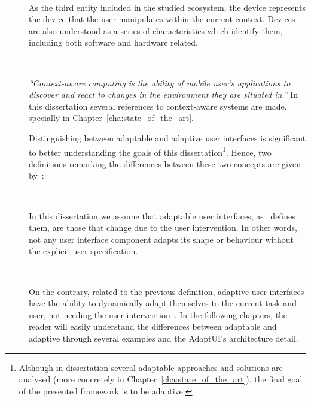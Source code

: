 \begin{description}
  \item[] \hfill \\
  \begin{mdframed}[hidealllines=true,backgroundcolor=gray!20]
  As the third entity included in the studied ecosystem, the device represents 
  the device that the user manipulates within the current context. Devices are
  also understood as a series of characteristics which identify them, including
  both software and hardware related.
  \end{mdframed}
  
  \item[] \hfill \\
  \begin{mdframed}[hidealllines=true,backgroundcolor=gray!20]
  \textit{``Context-aware computing is the ability of mobile user's applications 
  to discover and react to changes in the environment they are situated in.''} 
  In this dissertation several references to context-aware systems are made, 
  specially in Chapter~\ref{cha:state_of_the_art}.
  \end{mdframed}
  
  Distinguishing between adaptable and adaptive user interfaces is significant
  to better understanding the goals of this dissertation\footnote{Although in
  dissertation several adaptable approaches and solutions are analysed (more
  concretely in Chapter~\ref{cha:state_of_the_art}), the final goal of the 
  presented framework is to be adaptive.}. Hence, two definitions remarking the 
  differences between these two concepts are given by~\citeauthor{fischer_user_2001}:
  
  \item[] \hfill \\
  \begin{mdframed}[hidealllines=true,backgroundcolor=gray!20]
  In this dissertation we assume that adaptable user interfaces,
  as~\citet{fischer_user_2001} defines them, are those that change due to the 
  user intervention. In other words, not any user interface component adapts its
  shape or behaviour without the explicit user specification.
  \end{mdframed}

  \item[] \hfill \\
  \begin{mdframed}[hidealllines=true,backgroundcolor=gray!20]
  On the contrary, related to the previous definition, adaptive user interfaces
  have the ability to dynamically adapt themselves to the current task and user,
  not needing the user intervention~\citep{fischer_user_2001}. In the following
  chapters, the reader will easily understand the differences between adaptable 
  and adaptive through several examples and the AdaptUI's architecture detail.
  \end{mdframed}


\end{description}
